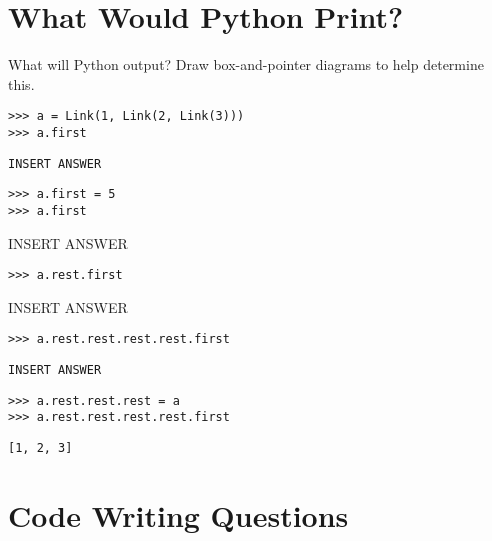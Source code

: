 \documentclass{exam}
\begin{document}
\section{What Would Python Print?}
\begin{questions}
\begin{blocksection}
\question What will Python output? Draw box-and-pointer diagrams to help determine this. 

\begin{lstlisting}
>>> a = Link(1, Link(2, Link(3)))
>>> a.first
\end{lstlisting}
\begin{solution}[.25in]
\begin{lstlisting}
INSERT ANSWER
\end{lstlisting}
\end{solution}

\begin{lstlisting}
>>> a.first = 5
>>> a.first
\end{lstlisting}
\begin{solution}[.25in]
INSERT ANSWER
\end{solution}


\begin{lstlisting}
>>> a.rest.first
\end{lstlisting}
\begin{solution}[.25in]
INSERT ANSWER
\end{solution}

\begin{lstlisting}
>>> a.rest.rest.rest.rest.first
\end{lstlisting}
\begin{solution}[.25in]
\begin{lstlisting}
INSERT ANSWER
\end{lstlisting}
\end{solution}

\begin{lstlisting}
>>> a.rest.rest.rest = a
>>> a.rest.rest.rest.rest.first
\end{lstlisting}
\begin{solution}[.25in]
\begin{lstlisting}
[1, 2, 3]
\end{lstlisting}
\end{solution}

\end{blocksection}

\section{Code Writing Questions}


\end{questions}
\end{document}
